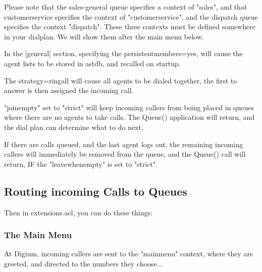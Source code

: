 Please note that the sales-general queue specifies a
context of "sales", and that customerservice specifies the
context of "customerservice", and the dispatch
queue specifies the context "dispatch". These three
contexts must be defined somewhere in your dialplan.
We will show them after the main menu below.

In the [general] section, specifying the persistentmembers=yes,
will cause the agent lists to be stored in astdb, and
recalled on startup.

The strategy=ringall will cause all agents to be dialed
together, the first to answer is then assigned the incoming
call.

"joinempty" set to "strict" will keep incoming callers from
being placed in queues where there are no agents to take calls.
The Queue() application will return, and the dial plan can
determine what to do next.

If there are calls queued, and the last agent logs out, the
remaining incoming callers will immediately be removed from
the queue, and the Queue() call will return, IF the "leavewhenempty" is
set to "strict".

\subsection{Routing incoming Calls to Queues}


Then in extensions.ael, you can do these things:

\subsubsection{The Main Menu}

At Digium, incoming callers are sent to the "mainmenu" context, where they
are greeted, and directed to the numbers they choose...

